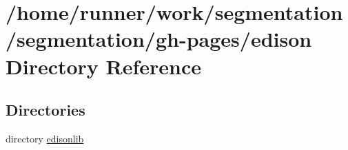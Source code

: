 \section{/home/runner/work/segmentation/segmentation/gh-\/pages/edison Directory Reference}
\label{dir_c8f5c4d6f826361c401baddc9909b4b2}
\subsection*{Directories}
\begin{DoxyCompactItemize}
\item 
directory \hyperlink{dir_e4f27251772675b4a85a1732d22dafa8}{edisonlib}
\end{DoxyCompactItemize}
